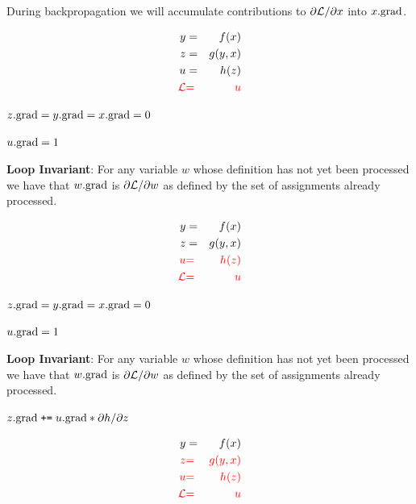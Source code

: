 {\bigskip
\bigskip
During backpropagation we will accumulate contributions to {\color{red} ${\partial {\cal L}}/{\partial x}$} into {\color{red} $x.\mathrm{grad}$}.


\vspace{-3ex}
\begin{eqnarray*}
  y & = & f(x) \\
  z & = & g(y,x) \\
  u & = & h(z) \\
  {\color{red} {\cal L}} &  {\color{red} =} & {\color{red}  u}
\end{eqnarray*}


\medskip
$z.\mathrm{grad} = y.\mathrm{grad} = x.\mathrm{grad} = 0$

\medskip
$u.\mathrm{grad} = 1$

\medskip
{\bf Loop Invariant}: For any variable $w$ whose definition has not yet been processed we have that $w.\mathrm{grad}$ is $\partial {\cal L}/\partial w$ as defined by the set of assignments already processed.

\vspace{-3ex}
\begin{eqnarray*}
  y & = & f(x) \\
  z & = & g(y,x) \\
  {\color{red} u} & {\color{red} =} & {\color{red} h(z)} \\
  {\color{red} {\cal L}} & {\color{red}  =} &  {\color{red} u}
\end{eqnarray*}

\medskip
$z.\mathrm{grad} = y.\mathrm{grad} = x.\mathrm{grad} = 0$

\medskip
$u.\mathrm{grad} = 1$

\medskip
{\bf Loop Invariant}: For any variable $w$ whose definition has not yet been processed we have that $w.\mathrm{grad}$ is $\partial {\cal L}/\partial w$ as defined by the set of assignments already processed.

\medskip
$z.\mathrm{grad}\;\mbox{\tt +=}\; u.\mathrm{grad} * {\partial h}/{\partial z}$

\vspace{-3ex}
\begin{eqnarray*}
  y & = & f(x) \\
  {\color{red} z} & {\color{red} =} & {\color{red} g(y,x)} \\
  {\color{red} u} & {\color{red} =} & {\color{red} h(z)} \\
  {\color{red} {\cal L}} & {\color{red} =} & {\color{red}  u}
\end{eqnarray*}

}
